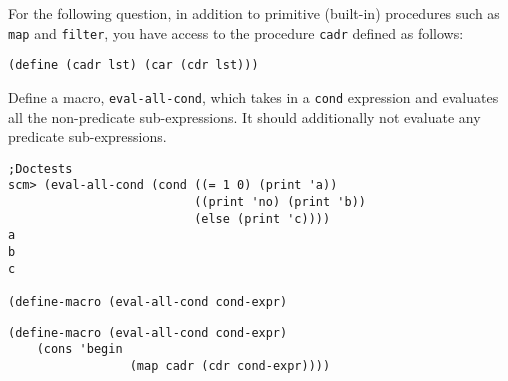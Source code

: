 \begin{blocksection}
For the following question, in addition to primitive (built-in) procedures such as \texttt{map} and \texttt{filter}, you have access to the procedure \texttt{cadr} defined as follows:

\begin{lstlisting}
(define (cadr lst) (car (cdr lst)))
\end{lstlisting}
\end{blocksection}

\begin{blocksection}
\question Define a macro, \texttt{eval-all-cond}, which takes in a \texttt{cond} expression and evaluates all the non-predicate sub-expressions. It should additionally not evaluate any predicate sub-expressions.
\begin{lstlisting}
;Doctests
scm> (eval-all-cond (cond ((= 1 0) (print 'a))
                          ((print 'no) (print 'b))
                          (else (print 'c))))
a
b
c

(define-macro (eval-all-cond cond-expr)
\end{lstlisting}


\begin{solution}[1in]
\begin{lstlisting}
(define-macro (eval-all-cond cond-expr)
    (cons 'begin
                 (map cadr (cdr cond-expr))))
\end{lstlisting}
\end{solution}
\end{blocksection}
